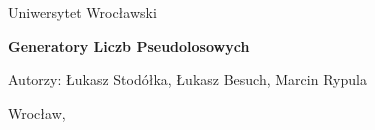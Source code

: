 \begin{titlepage}
    \centering

    {\large Uniwersytet Wrocławski\par}
    \vspace{1cm}

    {\Large\bfseries Generatory Liczb Pseudolosowych\par}
    \vspace{1.5cm}

    {\large Autorzy: Łukasz Stodółka, Łukasz Besuch, Marcin Rypula\par}
    \vspace{0.5cm}

    \vfill

    {\large Wrocław, \the\year\par}

\end{titlepage}